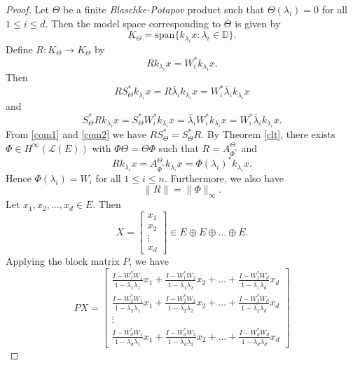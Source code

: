 \documentclass{amsart}
\theoremstyle{definition}
\newcommand{\oL }{\mathcal{L}(E) }
\begin{document}
\begin{proof}
Let $\Theta$ be a finite \emph{Blaschke-Potapov} product such that $\Theta(\lambda_i)=0$ for all $1\leq i\leq d$. Then the model space corresponding to $\Theta$ is given by
$$K_\Theta=\text{span}{\{k_{\lambda_i}x: \lambda_i\in \mathbb{D}}\}.$$
Define $R: K_{\Theta}\to K_{\Theta}$ by
$$Rk_{\lambda_i}x=W_{i}^*k_{\lambda_i}x.$$
Then
\begin{equation}\label{com1}
RS^*_{\Theta}k_{\lambda_i}x=R\overline{\lambda}_ik_{\lambda_i}x=W_{i}^*\overline{\lambda}_ik_{\lambda_i}x
\end{equation}
and
\begin{equation}\label{com2}
S^*_{\Theta}Rk_{\lambda_i}x=S^*_{\Theta}W^*_ik_{\lambda_i}x=\overline{\lambda}_iW^*_ik_{\lambda_i}x=W_{i}^*\overline{\lambda}_ik_{\lambda_i}x.
\end{equation}
From \eqref{com1} and \eqref{com2} we have $RS^*_{\Theta}=S^*_{\Theta}R$. By Theorem \ref{clt}, there exists $\Phi\in H^\infty(\oL)$ with $\Phi\Theta=\Theta\Phi$ such that $R=A_{\Phi^*}^{\Theta}$  and
$$Rk_{\lambda_i}x=A^\Theta_{\Phi^*}k_{\lambda_i}x=\Phi(\lambda_i)^*k_{\lambda_i}x.$$
Hence $\Phi(\lambda_i)=W_i$ for all $1\leq i\leq n$.
Furthermore, we also have
\begin{equation}\label{rphi}
\|R\|=\|\Phi\|_{\infty}.
\end{equation}
Let $x_1, x_2,...,x_d\in E$. Then
$$
X=\begin{bmatrix}
    x_1\\
    x_2\\
    \vdots\\
    x_d
\end{bmatrix}\in E\oplus E\oplus...\oplus E.
$$
Applying the block matrix $P$, we have
$$PX=\begin{bmatrix}
   \frac{I-W^*_1W_1}{1-\overline{\lambda_1}\lambda_1}x_1+ \frac{I-W^*_1W_2}{1-\overline{\lambda_1}\lambda_2}x_2+\dots+\frac{I-W^*_1W_d}{1-\overline{\lambda_1}\lambda_d}x_d \\
    \frac{I-W^*_2W_1}{1-\overline{\lambda_2}\lambda_1}x_1+ \frac{I-W^*_2W_2}{1-\overline{\lambda_2}\lambda_2}x_2+\dots+\frac{I-W^*_2W_d}{1-\overline{\lambda_2}\lambda_d}x_d\\
    \vdots\\
    \frac{I-W^*_dW_1}{1-\overline{\lambda_d}\lambda_1}x_1+ \frac{I-W^*_dW_2}{1-\overline{\lambda_d}\lambda_2}x_2+\dots+\frac{I-W^*_dW_d}{1-\overline{\lambda_d}\lambda_d}x_d

\end{bmatrix}$$
\end{proof}
\end{document}
